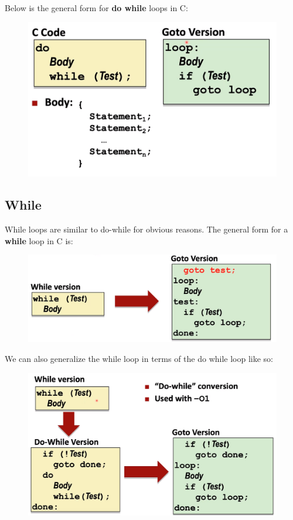 \documentclass[12pt]{book}
\begin{document}
Below is the general form for \textbf{do while} loops in C:
\begin{figure}[h]
        \centering
        \includegraphics[scale = 0.4]{./figures/doWhileGeneral}
\end{figure}
\pagebreak

\subsection*{While}
While loops are similar to do-while for obvious reasons. The general form for a \textbf{while} loop in C is:
\begin{figure}[h]
        \centering
        \includegraphics[scale = 0.4]{./figures/whileGeneral}
\end{figure}

We can also generalize the while loop in terms of the do while loop like so:
\begin{figure}[h]
        \centering
        \includegraphics[scale = 0.4]{./figures/whileGeneral2}
\end{figure}
\pagebreak
\end{document}
